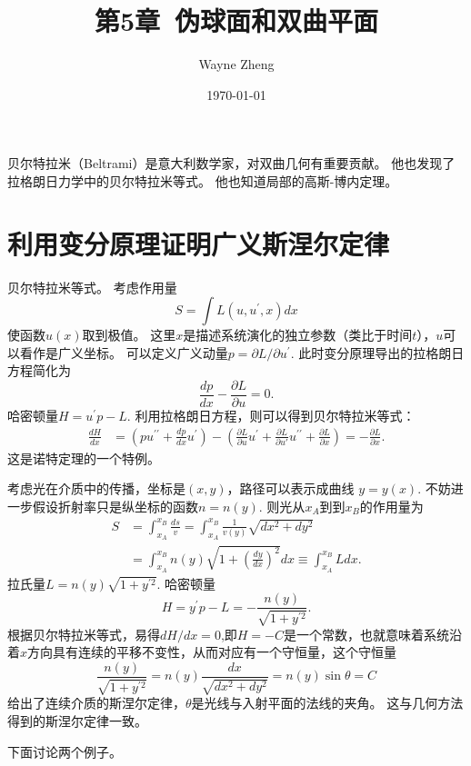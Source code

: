 \documentclass{article}
\title{第5章~伪球面和双曲平面}
\author{Wayne Zheng}
\date{\today}
\begin{document}
\maketitle

贝尔特拉米（Beltrami）是意大利数学家，对双曲几何有重要贡献。
他也发现了拉格朗日力学中的贝尔特拉米等式。
他也知道局部的高斯-博内定理。

\section{利用变分原理证明广义斯涅尔定律}

\begin{tcolorbox}[colback=white, arc=3mm, auto outer arc]
\begin{minipage}[c,t]{1.0\textwidth}
\kaishu
贝尔特拉米等式。
考虑作用量
\begin{equation*}
    S=\int{L}(u, u^{\prime}, x)dx
\end{equation*}
使函数$u(x)$取到极值。
这里$x$是描述系统演化的独立参数（类比于时间$t$），$u$可以看作是广义坐标。
可以定义广义动量$p=\partial{L}/\partial{u^{\prime}}$.
此时变分原理导出的拉格朗日方程简化为
\begin{equation*}
    \frac{dp}{dx}-\frac{\partial{L}}{\partial{u}}=0.
\end{equation*}
哈密顿量$H=u^{\prime}p-L$.
利用拉格朗日方程，则可以得到贝尔特拉米等式：
\begin{equation*}
\begin{aligned}
\frac{dH}{dx}
&=\left(pu^{\prime\prime}+\frac{dp}{dx}u^{\prime}\right)-\left(\frac{\partial{L}}{\partial{u}}u^{\prime}+\frac{\partial{L}}{\partial{u\prime}}u^{\prime\prime}+\frac{\partial{L}}{\partial{x}}\right)=-\frac{\partial{L}}{\partial{x}}.
\end{aligned}
\end{equation*}
这是诺特定理的一个特例。
\end{minipage}
\end{tcolorbox}

考虑光在介质中的传播，坐标是$(x, y)$，路径可以表示成曲线 $y=y(x)$.
不妨进一步假设折射率只是纵坐标的函数$n=n(y)$.
则光从$x_{A}$到到$x_{B}$的作用量为
\begin{equation}
\begin{aligned}
S
&=\int_{x_{A}}^{x_{B}}\frac{ds}{v}=\int_{x_{A}}^{x_{B}}\frac{1}{v(y)}\sqrt{dx^{2}+dy^{2}} \\
&=\int_{x_{A}}^{x_{B}}n(y)\sqrt{1+\left(\frac{dy}{dx}\right)^{2}}dx
\equiv\int_{x_{A}}^{x_{B}}Ldx.
\end{aligned}
\end{equation}
拉氏量$L=n(y)\sqrt{1+y^{\prime{2}}}$.
哈密顿量
\begin{equation}
    H
    =y^{\prime}p-L
    =-\frac{n(y)}{\sqrt{1+y^{\prime{2}}}}.
\end{equation}
根据贝尔特拉米等式，易得$dH/dx=0$,即$H=-C$是一个常数，也就意味着系统沿着$x$方向具有连续的平移不变性，从而对应有一个守恒量，这个守恒量
\begin{equation}
    \frac{n(y)}{\sqrt{1+y^{\prime{2}}}}
    =n(y)\frac{dx}{\sqrt{dx^{2}+dy^{2}}}
    =n(y)\sin\theta=C
\end{equation}
给出了连续介质的斯涅尔定律，$\theta$是光线与入射平面的法线的夹角。
这与几何方法得到的斯涅尔定律一致。

下面讨论两个例子。

%
%
\end{document}

